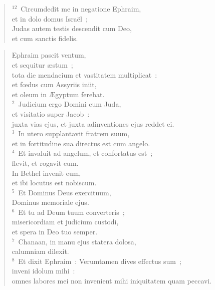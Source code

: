 \begin{flushleft}\begin{verse}${}^{12}$~Circumdedit me in negatione Ephraim,\\ et in dolo domus Isra\"el~;\\ Judas autem testis descendit cum Deo,\\ et cum sanctis fidelis.\end{verse}\end{flushleft}


\begin{flushleft}\begin{verse}\vspace{-19pt}\hspace{6pt}Ephraim pascit ventum,\\\hspace{6pt} et sequitur \ae stum~;\\ tota die mendacium et vastitatem multiplicat~:\\ et fœdus cum Assyriis iniit,\\ et oleum in \AE gyptum ferebat.\\
${}^{2}$~Judicium ergo Domini cum Juda,\\ et visitatio super Jacob~:\\ juxta vias ejus, et juxta adinventiones ejus reddet ei.\\
${}^{3}$~In utero supplantavit fratrem suum,\\ et in fortitudine sua directus est cum angelo.\\
${}^{4}$~Et invaluit ad angelum, et confortatus est~;\\ flevit, et rogavit eum.\\ In Bethel invenit eum,\\ et ibi locutus est nobiscum.\\
${}^{5}$~Et Dominus Deus exercituum,\\ Dominus memoriale ejus.\\
${}^{6}$~Et tu ad Deum tuum converteris~;\\ misericordiam et judicium custodi,\\ et spera in Deo tuo semper.\\
${}^{7}$~Chanaan, in manu ejus statera dolosa,\\ calumniam dilexit.\\
${}^{8}$~Et dixit Ephraim~: Verumtamen dives effectus sum~;\\ inveni idolum mihi~:\\ omnes labores mei non invenient mihi iniquitatem quam peccavi.\\

\end{verse}
\end{flushleft}
